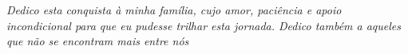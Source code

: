 \begin{dedicatoria}
   \vspace*{\fill}
   \centering
   \noindent
   \textit{Dedico esta conquista à minha família, cujo amor, paciência e apoio incondicional para que eu pudesse trilhar esta jornada. 
   Dedico também a aqueles que não se encontram mais entre nós} \vspace*{\fill}
\end{dedicatoria}
